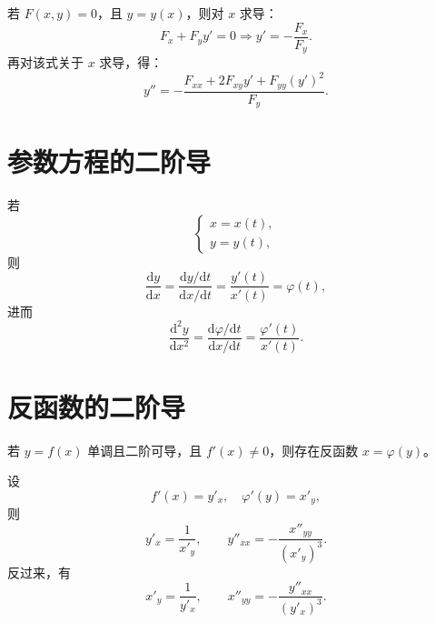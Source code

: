 若 $F(x, y) = 0$，且 $y = y(x)$，则对 $x$ 求导：
\[
    F_x + F_y y' = 0 \Rightarrow y' = -\frac{F_x}{F_y}.
\]
再对该式关于 $x$ 求导，得：
\[
    y'' = -\frac{F_{xx} + 2F_{xy}y' + F_{yy}(y')^2}{F_y}.
\]


\section{参数方程的二阶导}

若
\[
    \begin{cases}
        x = x(t), \\
        y = y(t),
    \end{cases}
\]
则
\[
    \frac{\mathrm{d}y}{\mathrm{d}x}
    = \frac{\mathrm{d}y/\mathrm{d}t}{\mathrm{d}x/\mathrm{d}t}
    = \frac{y'(t)}{x'(t)} = \varphi(t),
\]
进而
\[
    \frac{\mathrm{d}^2y}{\mathrm{d}x^2}
    = \frac{\mathrm{d}\varphi/\mathrm{d}t}{\mathrm{d}x/\mathrm{d}t}
    = \frac{\varphi'(t)}{x'(t)}.
\]


\section{反函数的二阶导}

若 $y=f(x)$ 单调且二阶可导，且 $f'(x)\ne0$，则存在反函数 $x=\varphi(y)$。

设
\[
    f'(x)=y'_x,\quad \varphi'(y)=x'_y,
\]
则
\[
    y'_x=\frac{1}{x'_y}, \qquad
    y''_{xx}=-\frac{x''_{yy}}{(x'_y)^3}.
\]
反过来，有
\[
    x'_y = \frac{1}{y'_x}, \qquad
    x''_{yy} = -\frac{y''_{xx}}{(y'_x)^3}.
\]